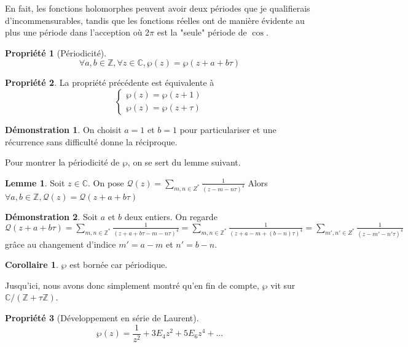 \documentclass{article}
\newcommand{\C}{\mathbb{C}} %
\newcommand{\Z}{\mathbb{Z}} %
\theoremstyle{definition} %
\newtheorem{lem}{Lemme}
\newtheorem{dem}{Démonstration}
\newtheorem{propri}{Propriété}
\newtheorem{cor}{Corollaire}
\newcommand{\1}{\mathbb{1}} %
\begin{document}
En fait, les fonctions holomorphes peuvent avoir deux périodes que je qualifierais d'incommensurables, tandis que les fonctions réelles ont de manière évidente au plus une période dans l'acception où $2\pi$ est la "seule" période de $\cos$.

\begin{propri}[Périodicité]
$$\forall a,b \in \Z, \forall z \in \C, \wp(z)=\wp(z + a + b \tau)$$
\end{propri}

\begin{propri}
La propriété précédente est équivalente à 
$$\begin{cases}
    \wp(z)=\wp(z+1) \\
    \wp(z)=\wp(z+\tau)
\end{cases}$$
\end{propri}

\begin{dem}
On choisit $a=1$ et $b=1$ pour particulariser et une récurrence sans difficulté donne la réciproque.
\end{dem}

Pour montrer la périodicité de $\wp$, on se sert du lemme suivant.

\begin{lem}
Soit $z \in \C$.
On pose $\mathcal{Q} (z)= \sum_{m,n \in Z^*} \frac{1}{(z - m -n \tau)^4}$
Alors $\forall a,b \in \Z, \mathcal{Q}(z)=\mathcal{Q}(z+a+ b \tau)$
\end{lem}

\begin{dem}
Soit $a$ et $b$ deux entiers.
On regarde $\mathcal{Q}(z+a+ b \tau)= \sum_{m,n \in \Z^*} \frac{1}{(z + a + b \tau - m - n \tau)^4}=\sum_{m,n \in \Z^*} \frac{1}{(z + a - m + (b - n)\tau  )^4} = \sum_{m',n' \in Z^*} \frac{1}{(z - m' -n' \tau)^4} $ 
grâce au changement d'indice $m'=a - m$
et $n'= b -n$.
\end{dem}

\begin{cor}
$\wp$ est bornée car périodique.
\end{cor}

Jusqu'ici, nous avons donc simplement montré qu'en fin de compte, $\wp$ vit sur $\C / (\Z + \tau \Z) $.

\begin{propri}[Développement en série de Laurent]
    $$\wp(z) = \frac{1}{z^2} + 3 E_4 z^2 + 5 E_6 z^4 + ... $$
\end{propri}
\end{document}
